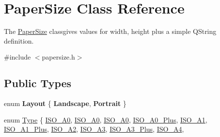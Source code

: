 \hypertarget{classPaperSize}{}\section{Paper\+Size Class Reference}
\label{classPaperSize}


The \mbox{\hyperlink{classPaperSize}{Paper\+Size}} classgives values for width, height plus a simple Q\+String definition.  




{\ttfamily \#include $<$papersize.\+h$>$}

\subsection*{Public Types}
\begin{DoxyCompactItemize}
\item 
\mbox{\label{classPaperSize_aa57c54d50016f1c46c553e479bc7d4da}} 
enum {\bfseries Layout} \{ {\bfseries Landscape}, 
{\bfseries Portrait}
 \}
\item 
enum \mbox{\hyperlink{classPaperSize_a0c3744aab15a171ac1681788f7169ed8}{Type}} \{ \newline
\mbox{\hyperlink{classPaperSize_a0c3744aab15a171ac1681788f7169ed8a6f5639cd3e9ed6513363629774c23527}{I\+S\+O\+\_\+A0}}, 
\mbox{\hyperlink{classPaperSize_a0c3744aab15a171ac1681788f7169ed8a26c62cf29a78d267e3c0b7a614a85966}{I\+S\+O\+\_\+A0}}, 
\mbox{\hyperlink{classPaperSize_a0c3744aab15a171ac1681788f7169ed8a45628b104e9380bed4ca994215a62a5d}{I\+S\+O\+\_\+\+A0}}, 
\mbox{\hyperlink{classPaperSize_a0c3744aab15a171ac1681788f7169ed8a5c27d4ed49a774de35db88e273846987}{I\+S\+O\+\_\+\+A0\+\_\+\+Plus}}, 
\newline
\mbox{\hyperlink{classPaperSize_a0c3744aab15a171ac1681788f7169ed8a8aabc0a24f36d8ace90a377d63d361aa}{I\+S\+O\+\_\+\+A1}}, 
\mbox{\hyperlink{classPaperSize_a0c3744aab15a171ac1681788f7169ed8a43ce27cfc7056e4b1987b82b33213854}{I\+S\+O\+\_\+\+A1\+\_\+\+Plus}}, 
\mbox{\hyperlink{classPaperSize_a0c3744aab15a171ac1681788f7169ed8ad186df7586a6192c9d86a559e8ea43e4}{I\+S\+O\+\_\+\+A2}}, 
\mbox{\hyperlink{classPaperSize_a0c3744aab15a171ac1681788f7169ed8afa144a3ac8baa66078dcff0daebb5fe4}{I\+S\+O\+\_\+\+A3}}, 
\newline
\mbox{\hyperlink{classPaperSize_a0c3744aab15a171ac1681788f7169ed8aaaceaee2a71db512493938dec4bd10e4}{I\+S\+O\+\_\+\+A3\+\_\+\+Plus}}, 
\mbox{\hyperlink{classPaperSize_a0c3744aab15a171ac1681788f7169ed8ad02beaeac18a6e48902dfcfd5eefeb78}{I\+S\+O\+\_\+\+A4}}, 

\end{DoxyCompactItemize}
